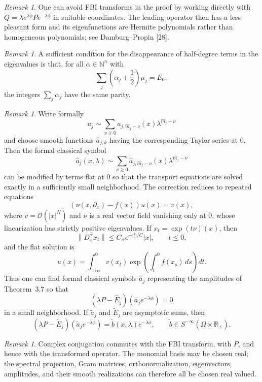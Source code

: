 \documentclass[11pt,a4paper]{article}
\newcommand{\R}{\mathbb R}
\newcommand{\N}{\mathbb N}
\newcommand{\cO}{\mathcal O}
\newcommand{\norm}[1]{\left\lVert #1\right\rVert}
\numberwithin{equation}{section}
\theoremstyle{remark}
\newtheorem{remark}[theorem]{Remark}
\begin{document}
\begin{remark}
One can avoid FBI transforms in the proof by working directly with $Q=\lambda e^{\lambda\phi}Pe^{-\lambda\phi}$ in suitable coordinates. The leading operator then has a less pleasant form and its eigenfunctions are Hermite polynomials rather than homogeneous polynomials; see Damburg--Propin [28].
\end{remark}

\begin{remark}
A sufficient condition for the disappearance of half-degree terms in the eigenvalues is that, for all $\alpha\in\N^n$ with
\[
\sum_j\left(\alpha_j+\frac12\right)\mu_j=E_0,
\]
the integers $\sum_j\alpha_j$ have the same parity.
\end{remark}

\begin{remark}
Write formally
\[
a_j\sim\sum_{\nu\ge0}a_{j,\widehat m_j-\nu}(x)\lambda^{\widehat m_j-\nu}
\]
and choose smooth functions $\widehat a_{j,k}$ having the corresponding Taylor series at $0$. Then the formal classical symbol
\[
\widehat a_j(x,\lambda)\sim\sum_{\nu\ge0}\widehat a_{j,\widehat m_j-\nu}(x)\lambda^{\widehat m_j-\nu}
\]
can be modified by terms flat at $0$ so that the transport equations are solved exactly in a sufficiently small neighborhood. The correction reduces to repeated equations
\[
(\nu(x,\partial_x)-f(x))u(x)=v(x),
\]
where $v=\cO(|x|^N)$ and $\nu$ is a real vector field vanishing only at $0$, whose linearization has strictly positive eigenvalues. If $x_t=\exp(t\nu)(x)$, then
\[
\norm{D_x^\alpha x_t}\le C_\alpha e^{-|t|/C}|x|,
\qquad t\le0,
\]
and the flat solution is
\begin{equation}
u(x)=\int_{-\infty}^0v(x_t)
\exp\left(\int_t^0 f(x_s)\,ds\right)dt.
\end{equation}
Thus one can find formal classical symbols $\widehat a_j$ representing the amplitudes of Theorem~3.7 so that
\[
(\lambda P-\widehat E_j)(\widehat a_je^{-\lambda\phi})=0
\]
in a small neighborhood. If $\widetilde a_j$ and $\widetilde E_j$ are asymptotic sums, then
\begin{equation}
(\lambda P-\widetilde E_j)(\widetilde a_je^{-\lambda\phi})
=\widetilde b(x,\lambda)e^{-\lambda\phi},
\qquad \widetilde b\in S^{-\infty}(\Omega\times\R_+).
\end{equation}
\end{remark}

\begin{remark}
Complex conjugation commutes with the FBI transform, with $P$, and hence with the transformed operator. The monomial basis may be chosen real; the spectral projection, Gram matrices, orthonormalization, eigenvectors, amplitudes, and their smooth realizations can therefore all be chosen real valued.
\end{remark}
\end{document}
